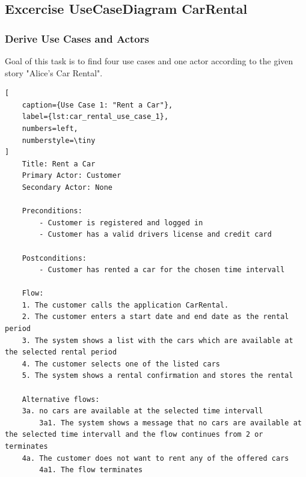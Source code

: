 \subsection{Excercise UseCaseDiagram CarRental}
\label{sec:exercise_use_case_diagram_car_rental}
\subsubsection*{Derive Use Cases and Actors}
Goal of this task is to find four use cases and one actor according to the given story "Alice's Car Rental".

\begin{lstlisting}[
    caption={Use Case 1: "Rent a Car"},
    label={lst:car_rental_use_case_1},
    numbers=left,
    numberstyle=\tiny
]
    Title: Rent a Car
    Primary Actor: Customer
    Secondary Actor: None

    Preconditions:
        - Customer is registered and logged in
        - Customer has a valid drivers license and credit card

    Postconditions:
        - Customer has rented a car for the chosen time intervall

    Flow:
    1. The customer calls the application CarRental.
    2. The customer enters a start date and end date as the rental period
    3. The system shows a list with the cars which are available at the selected rental period
    4. The customer selects one of the listed cars
    5. The system shows a rental confirmation and stores the rental

    Alternative flows:
    3a. no cars are available at the selected time intervall
        3a1. The system shows a message that no cars are available at the selected time intervall and the flow continues from 2 or terminates
    4a. The customer does not want to rent any of the offered cars
        4a1. The flow terminates    
\end{lstlisting}



